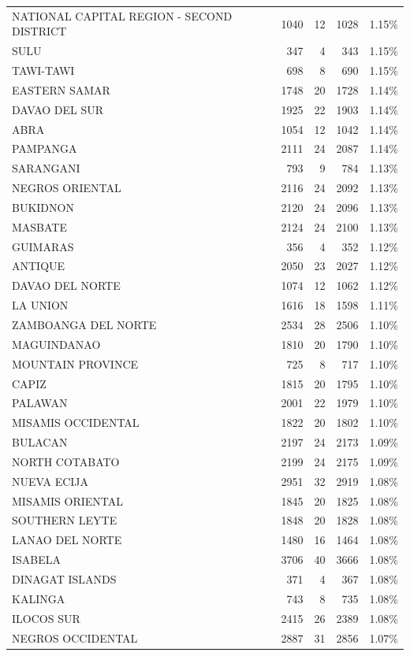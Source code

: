 \begin{tabular}{lrrrr}
NATIONAL CAPITAL REGION - SECOND DISTRICT & 1040 & 12 & 1028 & 1.15\% \\
SULU & 347 & 4 & 343 & 1.15\% \\
TAWI-TAWI & 698 & 8 & 690 & 1.15\% \\
EASTERN SAMAR & 1748 & 20 & 1728 & 1.14\% \\
DAVAO DEL SUR & 1925 & 22 & 1903 & 1.14\% \\
ABRA & 1054 & 12 & 1042 & 1.14\% \\
PAMPANGA & 2111 & 24 & 2087 & 1.14\% \\
SARANGANI & 793 & 9 & 784 & 1.13\% \\
NEGROS ORIENTAL & 2116 & 24 & 2092 & 1.13\% \\
BUKIDNON & 2120 & 24 & 2096 & 1.13\% \\
MASBATE & 2124 & 24 & 2100 & 1.13\% \\
GUIMARAS & 356 & 4 & 352 & 1.12\% \\
ANTIQUE & 2050 & 23 & 2027 & 1.12\% \\
DAVAO DEL NORTE & 1074 & 12 & 1062 & 1.12\% \\
LA UNION & 1616 & 18 & 1598 & 1.11\% \\
ZAMBOANGA DEL NORTE & 2534 & 28 & 2506 & 1.10\% \\
MAGUINDANAO & 1810 & 20 & 1790 & 1.10\% \\
MOUNTAIN PROVINCE & 725 & 8 & 717 & 1.10\% \\
CAPIZ & 1815 & 20 & 1795 & 1.10\% \\
PALAWAN & 2001 & 22 & 1979 & 1.10\% \\
MISAMIS OCCIDENTAL & 1822 & 20 & 1802 & 1.10\% \\
BULACAN & 2197 & 24 & 2173 & 1.09\% \\
NORTH COTABATO & 2199 & 24 & 2175 & 1.09\% \\
NUEVA ECIJA & 2951 & 32 & 2919 & 1.08\% \\
MISAMIS ORIENTAL & 1845 & 20 & 1825 & 1.08\% \\
SOUTHERN LEYTE & 1848 & 20 & 1828 & 1.08\% \\
LANAO DEL NORTE & 1480 & 16 & 1464 & 1.08\% \\
ISABELA & 3706 & 40 & 3666 & 1.08\% \\
DINAGAT ISLANDS & 371 & 4 & 367 & 1.08\% \\
KALINGA & 743 & 8 & 735 & 1.08\% \\
ILOCOS SUR & 2415 & 26 & 2389 & 1.08\% \\
NEGROS OCCIDENTAL & 2887 & 31 & 2856 & 1.07\% \\

\end{tabular}

